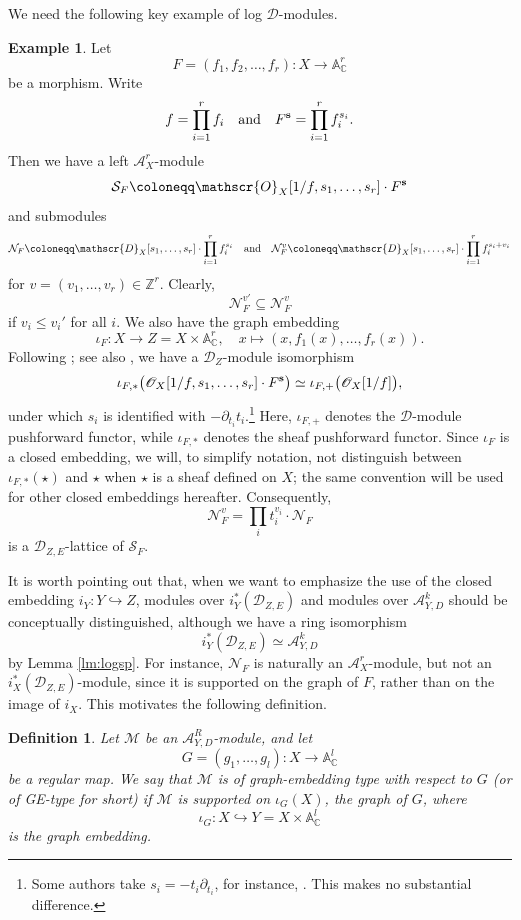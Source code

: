 \documentclass{amsart}
\theoremstyle{plain}
\numberwithin{theorem}{section}
\newtheorem{definition}[theorem]{Definition}
\theoremstyle{definition}
\newtheorem{example}{Example}
\theoremstyle{remark}
\theoremstyle{definition}
\newcommand{\A}{\mathbb{A}}
\newcommand{\C}{\mathbb{C}} %
\newcommand{\Z}{\mathbb{Z}}
\newcommand{\cM}{\mathcal{M}}
\newcommand{\cN}{\mathcal{N}}
\newcommand{\cO}{\mathscr{O}}
\newcommand{\cS}{\mathcal{S}}
\newcommand{\sA}{\mathscr{A}}
\newcommand{\shD}{\mathscr{D}}
\newcommand{\bs}{{\bf s}}
\begin{document}
We need the following key example of log $\shD$-modules.

\begin{example}\label{ex:maingrebex}
Let
\[
F=(f_1,f_2,\dots,f_r)\colon X\to \A_\C^r
\]
be a morphism. Write
\[
f=\prod_{i=1}^r f_i
\quad \textup{and} \quad
F^{\bs}=\prod_{i=1}^r f_i^{s_i}.
\]
Then we have a left $\sA_X^r$-module
\[
\cS_F
\coloneqq
\cO_X[1/f,s_1,\dots,s_r]\cdot F^{\bs}
\]
and submodules
\[
\cN_F
\coloneqq
\shD_X[s_1,\dots,s_r]\cdot \prod_{i=1}^r f_i^{s_i}
\quad \textup{and} \quad
\cN_F^v
\coloneqq
\shD_X[s_1,\dots,s_r]\cdot \prod_{i=1}^r f_i^{s_i+v_i}
\]
for $v=(v_1,\dots,v_r)\in \Z^r$. Clearly,
\[
\cN_F^{v'}\subseteq \cN_F^v
\]
if $v_i\le v_i'$ for all $i$. We also have the graph embedding
\[
\iota_F\colon X\rightarrow Z=X\times \A_\C^r,
\quad
x\mapsto (x,f_1(x),\dots,f_r(x)).
\]
Following \cite{MalV}; see also \cite[Prop.5.4]{ChDMu}, we have a $\shD_Z$-module isomorphism
\begin{equation}\label{be:graphemD}
\iota_{F,*}
\big(
\cO_X[1/f,s_1,\dots,s_r]\cdot F^{\bs}
\big)
\simeq
\iota_{F,+}\big(\cO_X[1/f]\big),
\end{equation}
under which $s_i$ is identified with $-\partial_{t_i}t_i$.\footnote{Some authors take $s_i=-t_i\partial_{t_i}$, for instance, \cite[Prop.A3.1]{Gil1}. This makes no substantial difference.}
Here, $\iota_{F,+}$ denotes the $\shD$-module pushforward functor, while $\iota_{F,*}$ denotes the sheaf pushforward functor. Since $\iota_F$ is a closed embedding, we will, to simplify notation, not distinguish between $\iota_{F,*}(\star)$ and $\star$ when $\star$ is a sheaf defined on $X$; the same convention will be used for other closed embeddings hereafter. Consequently,
\[
\cN_F^v
=
\prod_i t_i^{v_i}\cdot \cN_F
\]
is a $\shD_{Z,E}$-lattice of $\cS_F$.
\end{example}
It is worth pointing out that, when we want to emphasize the use of the closed embedding
$i_Y\colon Y\hookrightarrow Z$, modules over $i_Y^*(\shD_{Z,E})$ and modules over
$\sA^k_{Y,D}$ should be conceptually distinguished, although we have a ring
isomorphism
\[
i_Y^*(\shD_{Z,E})\simeq \sA^k_{Y,D}
\]
by Lemma \ref{lm:logsp}. For instance, $\cN_F$ is naturally an $\sA_X^r$-module,
but not an $i_X^*(\shD_{Z,E})$-module, since it is supported on the graph of $F$,
rather than on the image of $i_X$. This motivates the following definition.

\begin{definition}\label{def:getype}
Let $\cM$ be an $\sA^R_{Y,D}$-module, and let
\[
G=(g_1,\dots,g_l)\colon X\rightarrow \A_\C^l
\]
be a regular map. We say that $\cM$ is of \emph{graph-embedding type} with
respect to $G$ (or of \emph{GE-type} for short) if $\cM$ is supported on
$\iota_G(X)$, the graph of $G$, where
\[
\iota_G\colon X\hookrightarrow Y=X\times \A_\C^l
\]
is the graph embedding.
\end{definition}
\end{document}
